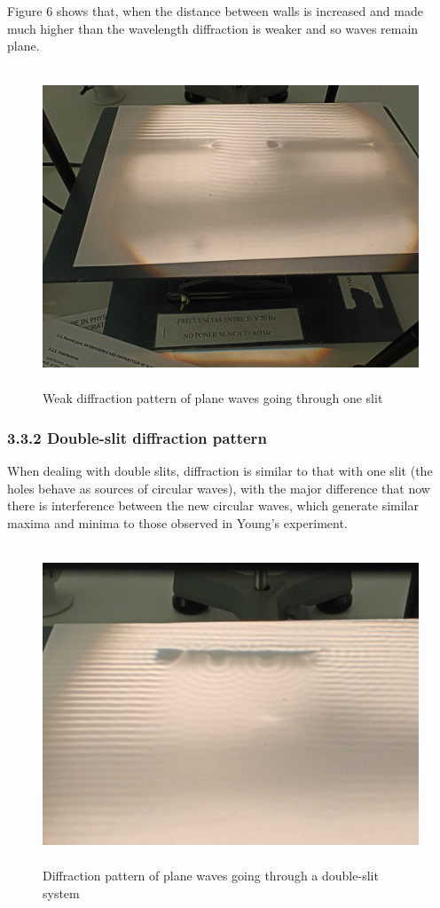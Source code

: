 \documentclass[a4paper, 12pt]{article}
\begin{document}
	Figure 6 shows that, when the distance between walls is increased and made much higher than the wavelength diffraction is weaker and so waves remain plane.
	\begin{figure}[hbt!]
		\centering
		\includegraphics[height=9.5cm]{1slitw}
		\caption{Weak diffraction pattern of plane waves going through one slit}
	\end{figure}
	\newpage
	\subsubsection{3.3.2 Double-slit diffraction pattern}
	When dealing with double slits, diffraction is similar to that with one slit (the holes behave as sources of circular waves), with the major difference that now there is interference between the new circular waves, which generate similar maxima and minima to those observed in Young's experiment.
	\begin{figure}[hbt!]
		\centering
		\includegraphics[height=9.5cm]{2slit}
		\caption{Diffraction pattern of plane waves going through a double-slit system}
	\end{figure}
\end{document}
